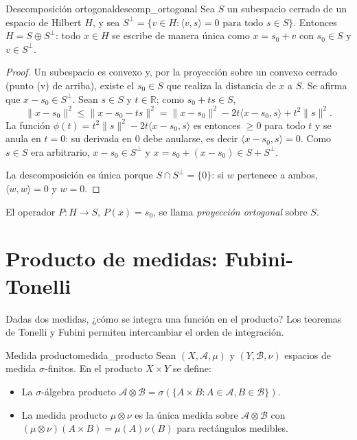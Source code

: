 \documentclass[11pt, a4paper]{article}
\begin{document}
\begin{teorema}{Descomposición ortogonal}{descomp_ortogonal}
Sea $S$ un subespacio cerrado de un espacio de Hilbert $H$, y sea
$S^\perp = \{v \in H : \langle v, s \rangle = 0 \text{ para todo } s \in S\}$. Entonces
$H = S \oplus S^\perp$: todo $x \in H$ se escribe de manera única como $x = s_0 + v$ con
$s_0 \in S$ y $v \in S^\perp$.
\end{teorema}

\begin{proof}
Un subespacio es convexo y, por la proyección sobre un convexo cerrado (punto (v) de arriba),
existe el $s_0 \in S$ que realiza la distancia de $x$ a $S$. Se afirma que
$x - s_0 \in S^\perp$. Sean $s \in S$ y $t \in \mathbb{R}$; como $s_0 + t s \in S$,
$$ \|x - s_0\|^2 \le \|x - s_0 - t s\|^2 = \|x - s_0\|^2 - 2 t \langle x - s_0, s \rangle +
t^2 \|s\|^2. $$
La función $\phi(t) = t^2 \|s\|^2 - 2 t \langle x - s_0, s \rangle$ es entonces $\ge 0$ para
todo $t$ y se anula en $t = 0$: su derivada en $0$ debe anularse, es decir
$\langle x - s_0, s \rangle = 0$. Como $s \in S$ era arbitrario, $x - s_0 \in S^\perp$ y
$x = s_0 + (x - s_0) \in S + S^\perp$.

La descomposición es única porque $S \cap S^\perp = \{0\}$: si $w$ pertenece a ambos,
$\langle w, w \rangle = 0$ y $w = 0$.
\end{proof}

El operador $P: H \to S$, $P(x) = s_0$, se llama \emph{proyección ortogonal} sobre $S$.

\newpage

\section{Producto de medidas: Fubini-Tonelli}

Dadas dos medidas, ¿cómo se integra una función en el producto? Los teoremas de Tonelli y
Fubini permiten intercambiar el orden de integración.

\begin{definicion}{Medida producto}{medida_producto}
Sean $(X, \mathcal{A}, \mu)$ y $(Y, \mathcal{B}, \nu)$ espacios de medida $\sigma$-finitos. En el
producto $X \times Y$ se define:
\begin{itemize}
    \item La $\sigma$-álgebra producto $\mathcal{A} \otimes \mathcal{B} = \sigma(\{A \times B :
    A \in \mathcal{A}, B \in \mathcal{B}\})$.
    \item La medida producto $\mu \otimes \nu$ es la única medida sobre $\mathcal{A} \otimes
    \mathcal{B}$ con $(\mu \otimes \nu)(A \times B) = \mu(A) \nu(B)$ para rectángulos medibles.
\end{itemize}
\end{definicion}
\end{document}
